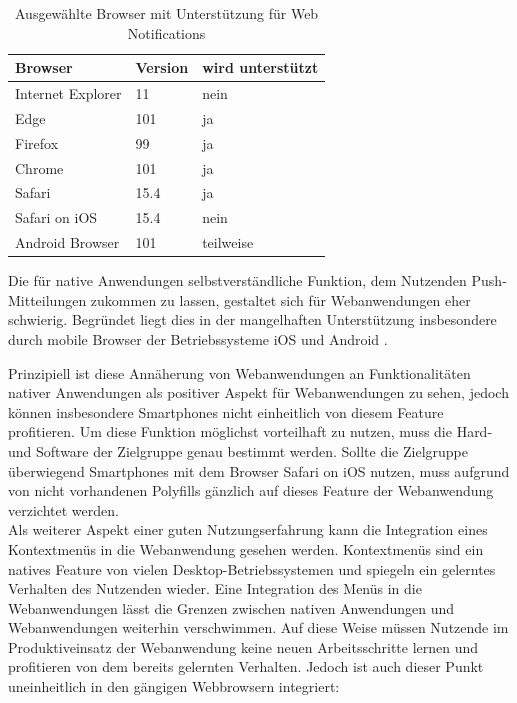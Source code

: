\documentclass[a4paper]{scrartcl}
\begin{document}
\begin{table}[H]
 	\centering
 	\caption{Ausgewählte Browser mit Unterstützung für Web Notifications}
 	\begin{center}
 		\begin{tabularx}{\linewidth}{| Y | Y | Y |}
 			\hline
 			\textbf{Browser} & \textbf{Version} & \textbf{wird unterstützt} \\
 			\hline \hline
 			Internet Explorer & 11 & nein \\
 			\hline
 			Edge & 101 & ja \\
 			\hline
 			Firefox & 99 & ja \\
 			\hline
 			Chrome & 101 & ja \\
 			\hline
 			Safari & 15.4 & ja \\
 			\hline
 			Safari on iOS & 15.4 & nein \\
 			\hline
 			Android Browser & 101 & teilweise \\
 			\hline
 		\end{tabularx}
 	\end{center}
 	Die für native Anwendungen selbstverständliche Funktion, dem Nutzenden Push-Mitteilungen zukommen zu lassen, gestaltet sich für Webanwendungen eher schwierig. Begründet liegt dies in der mangelhaften Unterstützung insbesondere durch mobile Browser der Betriebssysteme iOS und Android \autocite{Web_Notifications}. 
 \end{table}

Prinzipiell ist diese Annäherung von Webanwendungen an Funktionalitäten nativer Anwendungen als positiver Aspekt für Webanwendungen zu sehen, jedoch können insbesondere Smartphones nicht einheitlich von diesem Feature profitieren. Um diese Funktion möglichst vorteilhaft zu nutzen, muss die Hard- und Software der Zielgruppe genau bestimmt werden. Sollte die Zielgruppe überwiegend Smartphones mit dem Browser Safari on iOS nutzen, muss aufgrund von nicht vorhandenen Polyfills gänzlich auf dieses Feature der Webanwendung verzichtet werden. \\

Als weiterer Aspekt einer guten Nutzungserfahrung kann die Integration eines Kontextmenüs in die Webanwendung gesehen werden. Kontextmenüs sind ein natives Feature von vielen Desktop-Betriebssystemen und spiegeln ein gelerntes Verhalten des Nutzenden wieder. Eine Integration des Menüs in die Webanwendungen lässt die Grenzen zwischen nativen Anwendungen und Webanwendungen weiterhin verschwimmen. Auf diese Weise müssen Nutzende im Produktiveinsatz der Webanwendung keine neuen Arbeitsschritte lernen und profitieren von dem bereits gelernten Verhalten. Jedoch ist auch dieser Punkt uneinheitlich in den gängigen Webbrowsern integriert:
\end{document}
